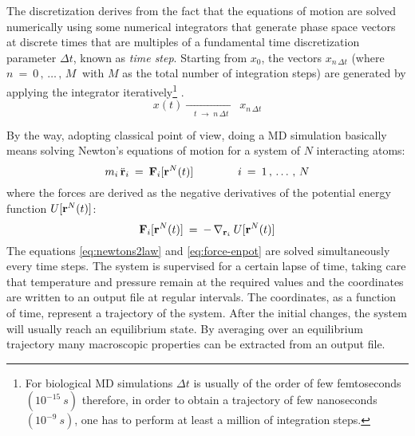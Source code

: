 The discretization derives from the fact that the equations of motion are solved numerically using some numerical integrators that generate phase space vectors at discrete times that are multiples of a fundamental time discretization parameter $\Delta t$, known as \textit{time step}.
Starting from $x_0$, the vectors $x_{n \, \Delta t}$ (where $n \:=\: 0 \, , \, \dots \, , \, M\:$ with $M$ as the total number of integration steps) are generated by applying the integrator iteratively\footnote{For biological MD simulations $\Delta t$ is usually of the order of few femtoseconds $(10^{-15} \: s)$ therefore, in order to obtain a trajectory of few nanoseconds $(10^{-9} \: s)$, one has to perform at least a million of integration steps.} \cite{ref:mypresentation}.
\begin{equation}\label{eq:discretization}
x(t) \xrightarrow[\quad t \;\rightarrow\; n\,\Delta t \quad]{} x_{n \, \Delta t}
\end{equation}

By the way, adopting classical point of view, doing a MD simulation basically means solving Newton's equations of motion for a system of $N$ interacting atoms: 
\begin{equation}\label{eq:newtons2law}
m_i \, \ddot{\bold{r}}_i \: = \: \bold{F}_i [\bold{r}^N(t)]
\qquad\qquad i \:=\: 1 \, , \, \dots \, , \, N
\end{equation}
where the forces are derived as the negative derivatives of the potential energy function $U [\bold{r}^N(t)]$:
\begin{equation}\label{eq:force-enpot}
\bold{F}_i [\bold{r}^N(t)] \:=\: - \, \nabla_{\bold{r}_i} \: U [\bold{r}^N(t)] 
\end{equation}
The equations \eqref{eq:newtons2law} and \eqref{eq:force-enpot} are solved simultaneously every time steps. The system is supervised for a certain lapse of time, taking care that temperature and pressure remain at the required values and the coordinates are written to an output file at regular intervals. The coordinates, as a function of time, represent a trajectory of the system. After the initial changes, the system will usually reach an equilibrium state. By averaging over an equilibrium trajectory many macroscopic properties can be extracted from an output file.

